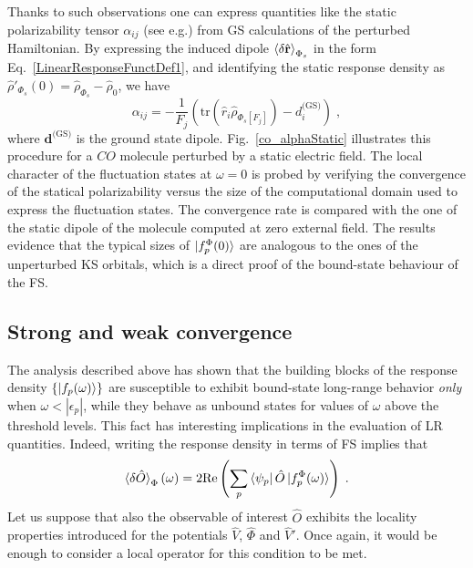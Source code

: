 \documentclass[reprint,aps,prb]{revtex4-1}
\newcommand{\eps}{\epsilon}
\newcommand{\be}{\begin{equation}}
\newcommand{\ee}{\end{equation}}
\newcommand{\lb}{\label}
\newcommand{\op}[1]{\hat {#1}}
\newcommand{\trace}[1]{\mathrm{tr}\left(#1\right)}
\newcommand{\dmnot}{\op{\rho}_0}
\newcommand{\dm}{\op{\rho}}
\begin{document}
Thanks to such observations one can express quantities like the static polarizability tensor $\alpha_{ij}$ (see e.g.\cite{DebElecField}) from GS calculations of the perturbed Hamiltonian.
By expressing the induced dipole $\braket{\delta \op{\mathbf r}}_{\Phi_s}$ in the form Eq.~\eqref{LinearResponseFunctDef1}, and identifying the static response density as $\dm'_{\Phi_s}(0) = \dm_{\Phi_s} -\dmnot $, we have
\be \label{staticalpha}
\alpha_{ij} = 
-\frac{1}{F_j} \left(\trace{\op r_i \dm_{\Phi_s[F_j]}} - d^{\text{(GS)}}_i \right)\;,
\ee
where $\mathbf d^\text{(GS)}$ is the ground state dipole.
Fig.~\eqref{co_alphaStatic} illustrates this procedure for a $CO$ molecule 
perturbed by a static electric field. The local character of the fluctuation states at $\omega=0$ is 
probed by verifying the convergence of the statical polarizability versus 
the size of the computational domain used to express the fluctuation states. The convergence rate is compared with the 
one of the static dipole of the molecule computed at zero external field. 
The results evidence that the typical sizes of $\ket{f^\Phi_p(0)}$ are analogous to the ones of the unperturbed KS orbitals, which is a direct proof of the bound-state behaviour of the FS.

\subsection{Strong and weak convergence}

The analysis described above has shown that the building blocks of the response density $\{\ket{f_p(\omega)}\}$ 
are susceptible to exhibit bound-state long-range behavior \emph{only} when $\omega < |\eps_p|$, 
while they behave as unbound states for values of $\omega$ above the threshold levels.
This fact has interesting implications in the evaluation of LR quantities. Indeed, writing the response 
density in terms of FS implies that 
\be\lb{LinearResponseFunctDef2}
\braket{\delta\op O}_\Phi(\omega) = 2\mathrm{Re} \left(\sum_p \bra{\psi_p}\op O\ket{f_p^\Phi(\omega)}\right) \;.
\ee
Let us suppose that also the observable of interest $\op O$ exhibits the locality properties introduced for the potentials $ \op V$, $\op \Phi$ and $\op V'$.
Once again, it would be enough to consider a local operator for this condition to be met.
\end{document}
